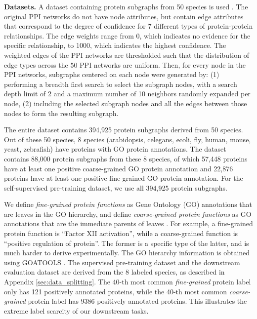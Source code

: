 \documentclass{article} \usepackage{iclr2020_conference,times}
\numberwithin{equation}{section}
\theoremstyle{plain}
\theoremstyle{definition}
\theoremstyle{remark}
\begin{document}
\label{app:protein-pt}
{\bf Datasets.} A dataset containing protein subgraphs from 50 species is used \citep{Zitnik2019}. The original PPI networks do not have node attributes, but contain edge attributes that correspond to the degree of confidence for 7 different types of protein-protein relationships. The edge weights range from 0, which indicates no evidence for the specific relationship, to 1000, which indicates the highest confidence. The weighted edges of the PPI networks are thresholded such that the distribution of edge types across the 50 PPI networks are uniform. Then, for every node in the PPI networks, subgraphs centered on each node were generated by: (1) performing a breadth first search to select the subgraph nodes, with a search depth limit of 2 and a maximum number of 10 neighbors randomly expanded per node, (2) including the selected subgraph nodes and all the edges between those nodes to form the resulting subgraph. 

The entire dataset contains 394,925 protein subgraphs derived from 50 species. Out of these 50 species, 8 species (arabidopsis, celegans, ecoli, fly, human, mouse, yeast, zebrafish) have proteins with GO protein annotations. The dataset contains 88,000 protein subgraphs from these 8 species, of which 57,448 proteins have at least one positive coarse-grained GO protein annotation and 22,876 proteins have at least one positive fine-grained GO protein annotation. For the self-supervised pre-training dataset, we use all 394,925 protein subgraphs. 

We define \emph{fine-grained protein functions} as Gene Ontology (GO) annotations
that are leaves in the GO hierarchy, and define \emph{coarse-grained protein functions} as GO annotations that are the immediate parents of leaves \citep{ashburner2000gene, gene2018gene}. For example, a fine-grained protein function is ``Factor XII activation'', while a coarse-grained function is ``positive regulation of protein''. The former is a specific type of the latter, and is much harder to derive experimentally. The GO hierarchy information is obtained using GOATOOLS \citep{klopfenstein2018goatools}.
The supervised pre-training dataset and the downstream evaluation dataset are derived from the 8 labeled species, as described in Appendix \ref{sec:data_splitting}.
The 40-th most common \emph{fine-grained} protein label only has 121 positively annotated proteins, while the 40-th most common \emph{coarse-grained} protein label has 9386 positively annotated proteins. This illustrates the extreme label scarcity of our downstream tasks.
\end{document}
